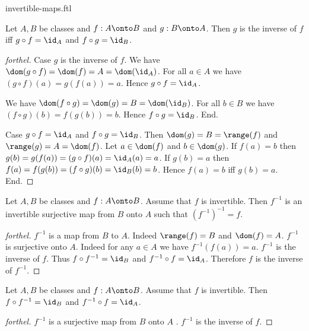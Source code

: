 \documentclass{naproche-library}
\begin{document}
\begin{smodule}{invertible-maps.ftl}
  \begin{proposition}[forthel,id=FOUNDATIONS_09_7840743571849216]
    Let $A, B$ be classes and $f : A \onto B$ and $g : B \onto A$.
    Then $g$ is the inverse of $f$ iff $g \circ f = \id_{A}$ and $f \circ g = \id_{B}$.
  \end{proposition}
  \begin{proof}[forthel]
    Case $g$ is the inverse of $f$.
      We have
      $\dom(g \circ f)
        = \dom(f)
        = A
        = \dom(\id_{A})$.
      For all $a \in A$ we have
      $(g \circ f)(a)
        = g(f(a))
        = a$.
      Hence $g \circ f = \id_{A}$.

      We have
      $\dom(f \circ g)
        = \dom(g)
        = B
        = \dom(\id_{B})$.
      For all $b \in B$ we have
      $(f \circ g)(b)
        = f(g(b))
        = b$.
      Hence $f \circ g = \id_{B}$.
    End.

    Case $g \circ f = \id_{A}$ and $f \circ g = \id_{B}$.
      Then $\dom(g)
        = B
        = \range(f)$
      and $\range(g)
        = A
        = \dom(f)$.
      Let $a \in \dom(f)$ and $b \in \dom(g)$.
      If $f(a) = b$ then
      $g(b)
        = g(f(a))
        = (g \circ f)(a)
        = \id_{A}(a)
        = a$.
      If $g(b) = a$ then
      $f(a)
        = f(g(b))
        = (f \circ g)(b)
        = \id_{B}(b)
        = b$.
      Hence $f(a) = b$ iff $g(b) = a$.
    End.
  \end{proof}

  \begin{proposition}[forthel,id=FOUNDATIONS_09_8414736098000896]
    Let $A, B$ be classes and $f : A \onto B$.
    Assume that $f$ is invertible.
    Then $f^{-1}$ is an invertible surjective map from $B$ onto $A$ such that $(f^{-1})^{-1} = f$.
  \end{proposition}
  \begin{proof}[forthel]
    $f^{-1}$ is a map from $B$ to $A$.
    Indeed $\range(f) = B$ and $\dom(f) = A$.
    $f^{-1}$ is surjective onto $A$.
    Indeed for any $a \in A$ we have $f^{-1}(f(a)) = a$.
    $f^{-1}$ is the inverse of $f$.
    Thus $f \circ f^{-1} = \id_{B}$ and $f^{-1} \circ f = \id_{A}$.
    Therefore $f$ is the inverse of $f^{-1}$.
  \end{proof}

  \begin{proposition}[forthel,id=FOUNDATIONS_09_4577560740495360]
    Let $A, B$ be classes and $f : A \onto B$.
    Assume that $f$ is invertible.
    Then $f \circ f^{-1} = \id_{B}$ and $f^{-1} \circ f = \id_{A}$.
  \end{proposition}
  \begin{proof}[forthel]
    $f^{-1}$ is a surjective map from $B$ onto $A$ .
    $f^{-1}$ is the inverse of $f$.
  \end{proof}


\end{smodule}
\end{document}
